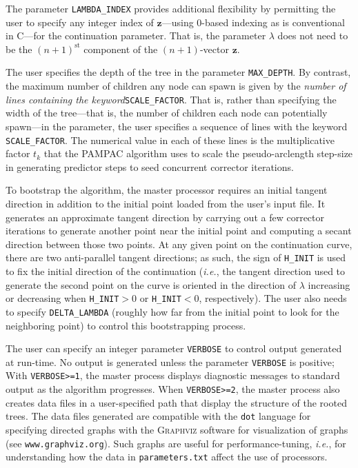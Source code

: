 \documentclass{article}
\renewcommand{\vec}[1]{{\mathbf{#1}}}
\newcommand{\ie}{\textit{i.e.}}
\newcommand{\pampac}{\textsc{PAMPAC}\xspace}
\begin{document}
The parameter \verb+LAMBDA_INDEX+ provides additional flexibility by permitting the user to specify any integer index of $\vec{z}$---using 0-based indexing as is conventional in C---for the continuation parameter.
%
That is, the parameter $\lambda$ does not need to be the $(n+1)^{\mathrm{st}}$ component of the $(n+1)$-vector $\vec{z}$.
%

The user specifies the depth of the tree in the parameter \verb+MAX_DEPTH+.
%
By contrast, the maximum number of children any node can spawn is given by the \textit{number of lines containing the keyword}\verb+SCALE_FACTOR+.
%
That is, rather than specifying the width of the tree---that is, the number of children each node can potentially spawn---in the parameter, the user specifies a sequence of lines with the keyword \verb+SCALE_FACTOR+.
%
The numerical value in each of these lines is the multiplicative factor $t_{k}$ that the \pampac algorithm uses to scale the pseudo-arclength step-size in generating predictor steps to seed concurrent corrector iterations.

%
To bootstrap the algorithm, the master processor requires an initial tangent direction in addition to
the initial point loaded from the user's input file.
%
It generates an approximate tangent direction by carrying out a few corrector iterations to generate another point near the initial point and computing a secant direction between those two points.
%
At any given point on the continuation curve, there are two anti-parallel tangent directions;
%
as such, the sign of  \verb+H_INIT+ is used to fix the initial direction of the continuation
(\ie, the tangent direction used to generate the second point on the curve is oriented in the direction of $\lambda$ increasing or decreasing when \verb^H_INIT^$>0$ or \verb^H_INIT^$<0$, respectively).
%
The user also needs to specify \verb+DELTA_LAMBDA+ (roughly how far from the initial point to look for the neighboring point) to control this bootstrapping process.
%


The user can specify an integer parameter \verb+VERBOSE+ to control output generated at run-time.
%
No output is generated unless the parameter \verb+VERBOSE+ is positive;
%
With \verb+VERBOSE>=1+, the master process displays diagnostic messages to standard output as the algorithm progresses.
%
When \verb+VERBOSE>=2+, the master process also creates data files in a user-specified path that display the structure of the rooted trees.
%
The data files generated are compatible with the \texttt{dot} language for specifying directed graphs with the \textsc{Graphviz} software for visualization of graphs (see \texttt{www.graphviz.org}).
%
Such graphs are useful for performance-tuning, \ie, for understanding how the data in \texttt{parameters.txt} affect the use of processors.
\end{document}
